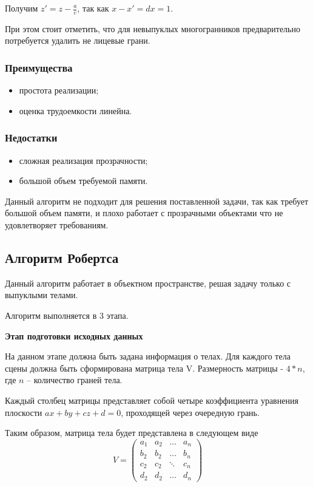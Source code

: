 Получим $z' = z - \frac{a}{c}$, так как $x - x' = dx = 1$.

При этом стоит отметить, что для невыпуклых многогранников предварительно потребуется удалить не лицевые грани.

\subsubsection*{Преимущества}
\begin{itemize}
	\item простота реализации;
	\item оценка трудоемкости линейна.
\end{itemize}
\subsubsection*{Недостатки}
\begin{itemize}
	\item сложная реализация прозрачности;
	\item большой объем требуемой памяти.
\end{itemize}

Данный алгоритм не подходит для решения поставленной задачи, так как требует большой объем памяти, и плохо работает с прозрачными объектами что не удовлетворяет требованиям. 



\subsection{Алгоритм Робертса}
Данный алгоритм работает в объектном пространстве, решая задачу только с выпуклыми телами.

Алгоритм выполняется в 3 этапа.

\textbf{Этап подготовки исходных данных}

На данном этапе должна быть задана информация о телах. Для каждого тела сцены должна быть сформирована матрица тела V. Размерность матрицы - $4*n$, где $n$ – количество граней тела.

Каждый столбец матрицы представляет собой четыре коэффициента уравнения плоскости  $ax+by+cz+d=0$, проходящей через очередную грань.

Таким образом, матрица тела будет представлена в следующем виде
\begin{equation}
	\label{eq:matr}
	V = \begin{pmatrix}
		a_{1} & a_{2} & \ldots & a_{n}\\
		b_{2} & b_{2} & \ldots & b_{n}\\
		c_{2} & c_{2} & \ddots & c_{n}\\
		d_{2} & d_{2} & \ldots & d_{n}
	\end{pmatrix}
\end{equation}

